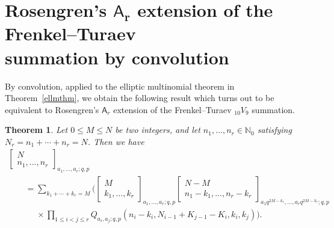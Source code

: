 \documentclass[10pt,a4paper]{amsart}
\numberwithin{equation}{section}
\newtheorem{Theorem}{Theorem}[section]
\theoremstyle{definition}
\newcommand{\N}{\mathbb N}
\begin{document}
\section[Rosengren's A\_r extension of the Frenkel--Turaev summation by convolution]{Rosengren's $\boldsymbol{\mathsf A_r}$ extension of the Frenkel--Turaev\\ summation by convolution}\label{sec:conv}

By convolution, applied to the elliptic multinomial theorem
in Theorem~\ref{ellmthm}, we obtain the following result
which turns out to be equivalent to Rosengren's $\mathsf A_r$ extension of
the Frenkel--Turaev $_{10}V_9$ summation.

\begin{Theorem}\label{thm:cf-Ar-FT}
Let $0\le M\le N$ be two integers, and let $n_1,\dots,n_r\in\N_0$
satisfying $N_r=n_1+\cdots+n_r=N$. Then we have
\begin{gather}
\begin{bmatrix}N\\n_1,\dots,n_r\end{bmatrix}_{a_1,\dots,a_r;q,p}\nonumber\\
\qquad =\sum_{k_1+\cdots+k_r=M}\bigg(
 \begin{bmatrix}M\\k_1,\dots,k_r\end{bmatrix}_{a_1,\dots,a_r;q,p}
\begin{bmatrix}N-M\\n_1-k_1,\dots,n_r-k_r\end{bmatrix}_{a_1q^{2M-k_1},\dots,a_rq^{2M-k_r};q,p}\nonumber\\
\phantom{\qquad=}{}\times\prod_{1\le i<j\le r}Q_{a_i,a_j;q,p}
(n_i-k_i,N_{i-1}+K_{j-1}-K_i,k_i,k_j)\bigg).\label{eq:cf-Ar-FT}
\end{gather}
\end{Theorem}
\end{document}
